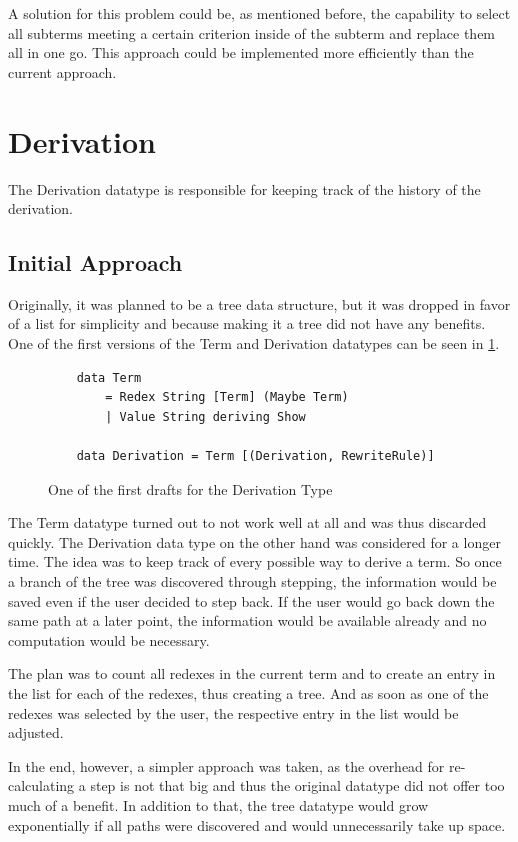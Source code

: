 A solution for this problem could be, as mentioned before,
the capability to select all subterms meeting a certain criterion inside of the subterm and replace them all in one go.
This approach could be implemented more efficiently than the current approach.


\section{Derivation}
The Derivation datatype is responsible for keeping track of the history of the derivation.

\subsection{Initial Approach}
Originally,
it was planned to be a tree data structure,
but it was dropped in favor of a list for simplicity and because making it a tree did not have any benefits.
One of the first versions of the Term and Derivation datatypes can be seen in \ref*{fig:originalDerivation}.

\begin{figure}[!ht]
    \begin{verbatim}
    data Term
        = Redex String [Term] (Maybe Term)
        | Value String deriving Show
    
    data Derivation = Term [(Derivation, RewriteRule)]
    \end{verbatim}
    \caption{One of the first drafts for the Derivation Type}
    \label{fig:originalDerivation}
\end{figure}

The Term datatype turned out to not work well at all and was thus discarded quickly.
The Derivation data type on the other hand was considered for a longer time.
The idea was to keep track of every possible way to derive a term.
So once a branch of the tree was discovered through stepping,
the information would be saved even if the user decided to step back.
If the user would go back down the same path at a later point,
the information would be available already and no computation would be necessary.

The plan was to count all redexes in the current term
and to create an entry in the list for each of the redexes,
thus creating a tree.
And as soon as one of the redexes was selected by the user,
the respective entry in the list would be adjusted.

In the end, however,
a simpler approach was taken,
as the overhead for re-calculating a step is not that big and thus the original datatype did not offer too much of a benefit.
In addition to that,
the tree datatype would grow exponentially if all paths were discovered and would unnecessarily take up space.

